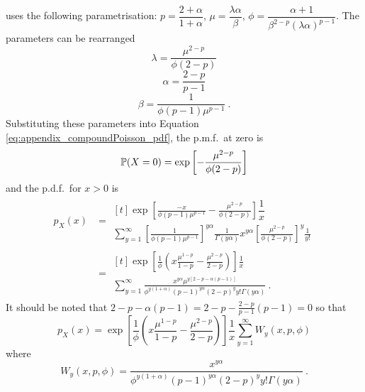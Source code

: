 \cite{jorgensen1987exponential} uses the following parametrisation: $p=\dfrac{2+\alpha}{1+\alpha}$, $\mu=\dfrac{\lambda\alpha}{\beta}$, $\phi = \dfrac{\alpha+1}{\beta^{2-p}(\lambda\alpha)^{p-1}}$. The parameters can be rearranged
\begin{equation}
  \lambda=\frac{\mu^{2-p}}{\phi(2-p)}
\end{equation}
\begin{equation}
  \alpha=\frac{2-p}{p-1}
\end{equation}
\begin{equation}
  \beta=\frac{1}{\phi(p-1)\mu^{p-1}} \ .
\end{equation}
Substituting these parameters into Equation \eqref{eq:appendix_compoundPoisson_pdf}, the p.m.f.~at zero is
\begin{equation}
  \operatorname{\mathbb{P}}(X=0) = \exp
  \left[
      -\frac{\mu^{2-p}}{\phi(2-p)}
  \right]
\end{equation}
and the p.d.f.~for $x>0$ is
\begin{align*}
  p_X(x) &=
  \begin{multlined}[t]
    \exp\left[
        \frac{-x}{\phi(p-1)\mu^{p-1}}
        -\frac{\mu^{2-p}}{\phi(2-p)}
    \right]
    \dfrac{1}{x}
    \\
    \sum_{y=1}^{\infty}
    \left[
      \frac{1}{\phi(p-1)\mu^{p-1}}
    \right]^{y\alpha}
    \frac{1}{\Gamma(y\alpha)}
    x^{y\alpha}
    \left[
      \frac{\mu^{2-p}}{\phi(2-p)}
    \right]^y
    \frac{1}{y!}
  \end{multlined}
  \\
  &= 
  \begin{multlined}[t]
    \exp\left[
      \frac{1}{\phi}\left(x\frac{\mu^{1-p}}{1-p}-\frac{\mu^{2-p}}{2-p}\right)
    \right]
    \frac{1}{x}
    \\
    \sum_{y=1}^{\infty}\frac{x^{y\alpha}\mu^{y[2-p-\alpha(p-1)]}}{\phi^{y(1+\alpha)}(p-1)^{y\alpha}(2-p)^yy!\Gamma(y\alpha)}
    \ .
  \end{multlined}
\end{align*}
It should be noted that $2-p-\alpha(p-1) = 2-p - \frac{2-p}{p-1}(p-1) =0$ so that
\begin{equation}
  p_X(x) = 
  \exp\left[
    \frac{1}{\phi}
    \left(
      x\frac{\mu^{1-p}}{1-p}-\frac{\mu^{2-p}}{2-p}
    \right)
  \right]
  \frac{1}{x}
  \sum_{y=1}^{\infty}W_y(x,p,\phi)
\end{equation}
where
\begin{equation}
  W_y(x,p,\phi)=\frac{x^{y\alpha}}{\phi^{y(1+\alpha)}(p-1)^{y\alpha}(2-p)^yy!\Gamma(y\alpha)}
  \ .
\end{equation}


